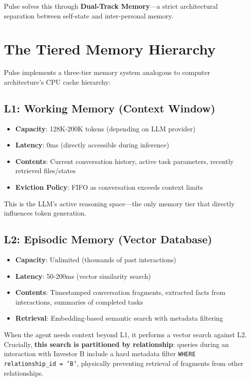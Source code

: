 Pulse solves this through \textbf{Dual-Track Memory}—a strict architectural separation between self-state and inter-personal memory.

\section{The Tiered Memory Hierarchy}

Pulse implements a three-tier memory system analogous to computer architecture's CPU cache hierarchy:

\subsection{L1: Working Memory (Context Window)}

\begin{itemize}
    \item \textbf{Capacity}: 128K-200K tokens (depending on LLM provider)
    \item \textbf{Latency}: 0ms (directly accessible during inference)
    \item \textbf{Contents}: Current conversation history, active task parameters, recently retrieved files/states
    \item \textbf{Eviction Policy}: FIFO as conversation exceeds context limits
\end{itemize}

This is the LLM's active reasoning space—the only memory tier that directly influences token generation.

\subsection{L2: Episodic Memory (Vector Database)}

\begin{itemize}
    \item \textbf{Capacity}: Unlimited (thousands of past interactions)
    \item \textbf{Latency}: 50-200ms (vector similarity search)
    \item \textbf{Contents}: Timestamped conversation fragments, extracted facts from interactions, summaries of completed tasks
    \item \textbf{Retrieval}: Embedding-based semantic search with metadata filtering
\end{itemize}

When the agent needs context beyond L1, it performs a vector search against L2. Crucially, \textbf{this search is partitioned by relationship}: queries during an interaction with Investor B include a hard metadata filter \texttt{WHERE relationship\_id = 'B'}, physically preventing retrieval of fragments from other relationships.

